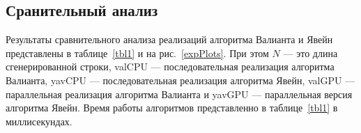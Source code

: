 \documentclass[14pt]{matmex-diploma-custom}
\begin{document}
\subsection{Сранительный анализ}

Результаты сравнительного анализа реализаций алгоритма Валианта и Явейн представлены в таблице~\ref{tbl1} и на рис.~\ref{expPlots}. 
При этом $N$ –-- это длина сгенерированной строки, valCPU --- последовательная реализация алгоритма Валианта, yavCPU --- последовательная реализация алгоритма Явейн, valGPU --- параллельная реализация алгоритма Валианта и yavGPU --- параллельная версия алгоритма Явейн.
Время работы алгоритмов представленно в таблице~\ref{tbl1}  в миллисекундах.


\begin{table}[h]
\caption{Результаты сравнительного анализа (время в мс)}
\label{tbl1}
\centering
{}
\end{table}
\end{document}
